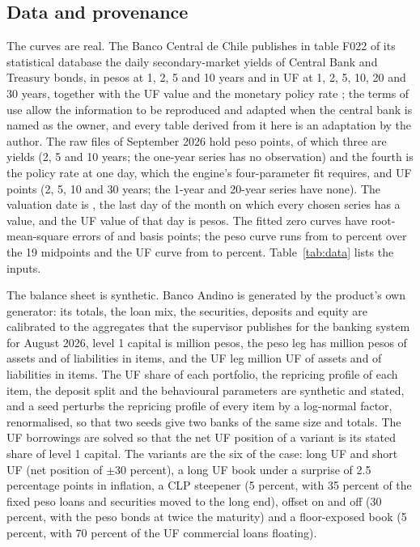

\subsection{Data and provenance}
\label{sec:design-data}

The curves are real. The Banco Central de Chile publishes in table F022 of its statistical database the daily secondary-market yields of Central Bank and Treasury bonds, in pesos at 1, 2, 5 and 10 years and in UF at 1, 2, 5, 10, 20 and 30 years, together with the UF value and the monetary policy rate \citep{BCCh_BDE}; the terms of use allow the information to be reproduced and adapted when the central bank is named as the owner, and every table derived from it here is an adaptation by the author. The raw files of September 2026 hold \nTenorsClp{} peso points, of which three are yields (2, 5 and 10 years; the one-year series has no observation) and the fourth is the policy rate at one day, which the engine's four-parameter fit requires, and \nTenorsUr{} UF points (2, 5, 10 and 30 years; the 1-year and 20-year series have none). The valuation date is \valDate{}, the last day of the month on which every chosen series has a value, and the UF value of that day is \ufValue{} pesos. The fitted zero curves have root-mean-square errors of \rmseClp{} and \rmseUr{} basis points; the peso curve runs from \shortClp{} to \longClp{} percent over the 19 midpoints and the UF curve from \shortUr{} to \longUr{} percent. Table~\ref{tab:data} lists the inputs.



The balance sheet is synthetic. Banco Andino is generated by the product's own generator: its totals, the loan mix, the securities, deposits and equity are calibrated to the aggregates that the supervisor publishes for the banking system for August 2026, level 1 capital is \tierOne{} million pesos, the peso leg has \clpAssets{} million pesos of assets and \clpLiabs{} of liabilities in \nItemsClp{} items, and the UF leg \urAssetsUf{} million UF of assets and \urLiabsUf{} of liabilities in \nItemsUr{} items. The UF share of each portfolio, the repricing profile of each item, the deposit split and the behavioural parameters are synthetic and stated, and a seed perturbs the repricing profile of every item by a log-normal factor, renormalised, so that two seeds give two banks of the same size and totals. The UF borrowings are solved so that the net UF position of a variant is its stated share of level 1 capital. The variants are the six of the case: long UF and short UF (net position of $\pm30$ percent), a long UF book under a surprise of 2.5 percentage points in inflation, a CLP steepener (5 percent, with 35 percent of the fixed peso loans and securities moved to the long end), offset on and off (30 percent, with the peso bonds at twice the maturity) and a floor-exposed book (5 percent, with 70 percent of the UF commercial loans floating).

